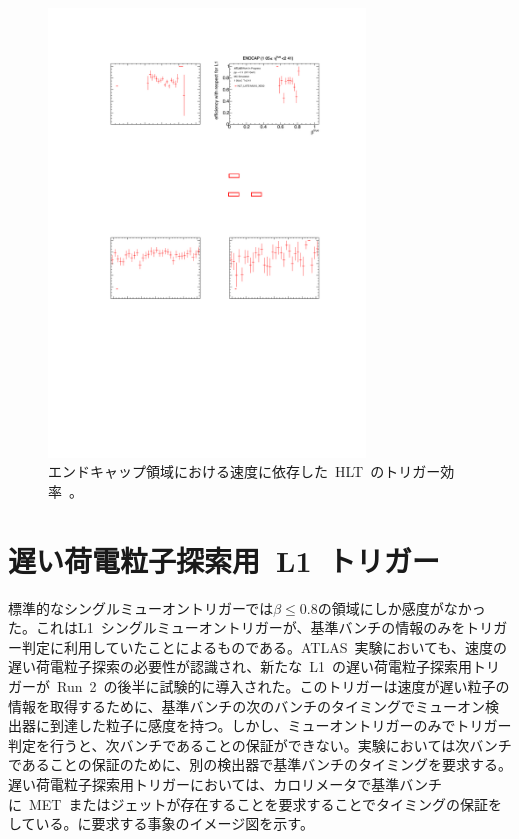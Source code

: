 \begin{figure}[H]
        \centering   
        \includegraphics[width=0.75\textwidth,page=1]{img/pdf3/hlt.pdf}
        \caption[エンドキャップ領域における速度に依存した HLT のトリガー効率]{エンドキャップ領域における速度に依存した~HLT~のトリガー効率~\cite{MT:01}。}
        \label{fig:hlt}
\end{figure}

\section{遅い荷電粒子探索用~L1~トリガー}
\label{sec:latemu}
標準的なシングルミューオントリガーでは$\beta{\leq}0.8$の領域にしか感度がなかった。これはL1~シングルミューオントリガーが、基準バンチの情報のみをトリガー判定に利用していたことによるものである。ATLAS~実験においても、速度の遅い荷電粒子探索の必要性が認識され、新たな~L1~の遅い荷電粒子探索用トリガーが~Run~2~の後半に試験的に導入された。このトリガーは速度が遅い粒子の情報を取得するために、基準バンチの次のバンチのタイミングでミューオン検出器に到達した粒子に感度を持つ。しかし、ミューオントリガーのみでトリガー判定を行うと、次バンチであることの保証ができない。実験においては次バンチであることの保証のために、別の検出器で基準バンチのタイミングを要求する。遅い荷電粒子探索用トリガーにおいては、カロリメータで基準バンチに~MET~またはジェットが存在することを要求することでタイミングの保証をしている。に要求する事象のイメージ図を示す。

